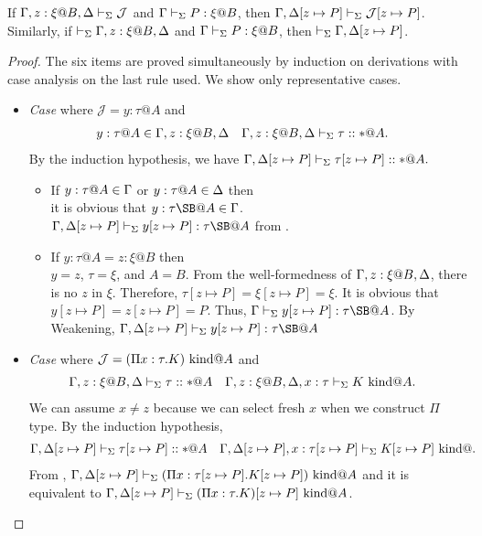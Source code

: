 \begin{theorem}
	If $\G, z:\xi@B, \D \V \mathcal{J}$ and $\Gamma\vdash_\Sigma P:\xi @B$, then $\Gamma, \Delta[z \mapsto P] \vdash_\Sigma \mathcal{J}[z \mapsto P]$.  Similarly, if $\V \G, z:\xi@B, \D$ and
	$\Gamma\vdash_\Sigma P:\xi @B$, then $\vdash_\Sigma \Gamma, \Delta[z \mapsto P]$.
\end{theorem}
\begin{proof}
	The six items are proved simultaneously by induction on derivations with case analysis on the last rule used.
	We show only representative cases.
	\begin{itemize}
								
		\newcommand{\SB}{[z \mapsto P]}
		\newcommand{\GG}{\G}
		\newcommand{\GGV}{\G \V}
								
		\item[] \textit{Case} \TVar{} where \(\mathcal{J} = y:\tau@A\) and 
		      \begin{align*} 
		      	  & y:\tau@A \in \G, z:\xi@B, \D &   & \G, z:\xi@B,\D \V \tau::*@A. 
		      \end{align*}
		      By the induction hypothesis, we have \(\G, \D\SB \V \tau\SB::*@A.\)
		      		      		      
		      \begin{itemize}
		      	\item If $y:\tau@A \in \G$ or $y:\tau@A \in \D$ then\\
		      	      it is obvious that $y:\tau\SB@A \in \GG$.\\
		      	      \(\G,\D\SB \V y\SB:\tau\SB@A\) from \TVar.
		      	      	      	      		      	      	      		      	      
		      	\item If $y:\tau@A = z:\xi@B$ then\\
		      	      $y = z$, $\tau = \xi$, and $A = B$.
		      	      From the well-formedness of \( \G, z:\xi@B,\D \), there is no $z$ in $\xi$.
		      	      Therefore, $\tau\SB = \xi\SB = \xi$.
		      	      It is obvious that $y\SB = z\SB = P$.
		      	      Thus, $\G \V y\SB : \tau\SB@A$.
		      	      By Weakening, $\G,\D\SB \V y\SB : \tau\SB@A$
		      	      
			  \end{itemize}
		  \vspace{3mm}

	\item[] \textit{Case} \WAbs{} where \( \mathcal{J} =  (\Pi x:\tau.K) \text{\ kind} @A\) and
		  \begin{align*}	      	      	      
			& \G, z:\xi@B, \D \V \tau::*@A && \G, z:\xi@B, \D, x:\tau \V K \iskind@A.
		  \end{align*}
		  We can assume $x \neq z$ because we can select fresh $x$ when we construct $\Pi$ type.
		  By the induction hypothesis,
		  \begin{align*}
			& \G,\D\SB \V \tau\SB::*@A && \G,\D\SB, x:\tau\SB \V K\SB \iskind@.
		  \end{align*}
		  From \WAbs, $\G,\D\SB \V (\Pi x:\tau\SB.K\SB) \iskind @A$ and 
		  it is equivalent to $\G,\D\SB \V (\Pi x:\tau.K)\SB \iskind @A$.
		  \vspace{3mm}


\end{itemize}
\end{proof}
